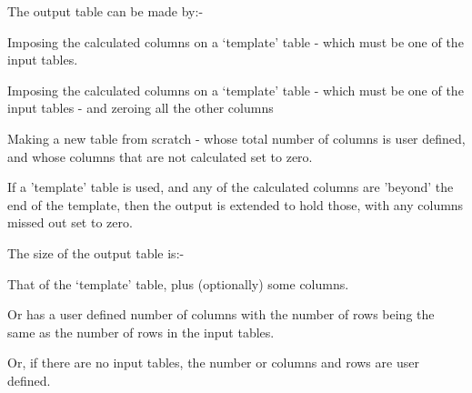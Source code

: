 {{ The output table can be made by:-

  \begin{list}{{-}}{}
   \item  Imposing the calculated columns on a `template' table - which
          must be one of the input tables.
   \item  Imposing the calculated columns on a `template' table - which
          must be one of the input tables - and zeroing all the other
          columns
   \item  Making a new table from scratch - whose total number of
          columns is user defined, and whose columns that are not
          calculated set to zero.
   \end{list}

 If a 'template' table is used, and any of the calculated columns
 are 'beyond' the end of the template, then the output is extended 
 to hold those, with any columns missed out set to zero.
                                                                       
 The size of the output table is:-
   
  \begin{list}{{-}}{}
  \item That of the `template' table, plus (optionally) some columns.
  \item Or has a user defined number of columns with the number of rows
        being the same as the number of rows in the input tables.
  \item Or, if there are no input tables, the number or columns and rows
        are user defined.
  \end{list}
                                                                               
}}
